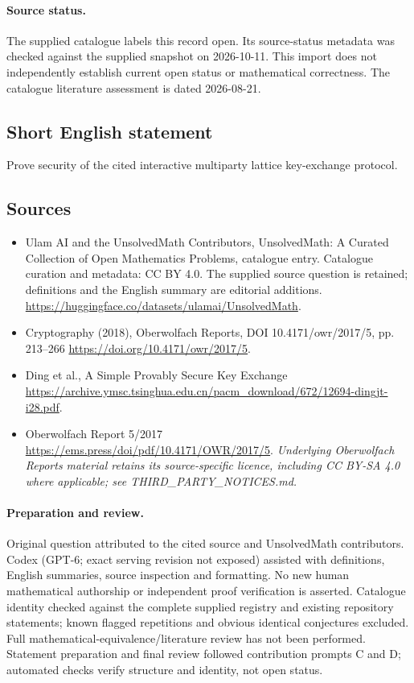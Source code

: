 \documentclass[11pt]{article}
\begin{document}
\paragraph{Source status.}
The supplied catalogue labels this record open. Its source-status metadata was checked against the supplied snapshot on 2026-10-11. This import does not independently establish current open status or mathematical correctness. The catalogue literature assessment is dated 2026-08-21.
\subsection{Short English statement}
Prove security of the cited interactive multiparty lattice key-exchange protocol.
\subsection{Sources}
\begin{itemize}
\item[\hypertarget{source:statement:1}{S1}] Ulam AI and the UnsolvedMath Contributors, UnsolvedMath: A Curated Collection of Open Mathematics Problems, catalogue entry. Catalogue curation and metadata: CC BY 4.0. The supplied source question is retained; definitions and the English summary are editorial additions.
\url{https://huggingface.co/datasets/ulamai/UnsolvedMath}.
\item[\hypertarget{source:statement:2}{S2}] Cryptography (2018), Oberwolfach Reports, DOI 10.4171/owr/2017/5, pp. 213--266
\url{https://doi.org/10.4171/owr/2017/5}.
\item[\hypertarget{source:statement:3}{S3}] Ding et al., A Simple Provably Secure Key Exchange
\url{https://archive.ymsc.tsinghua.edu.cn/pacm_download/672/12694-dingjt-i28.pdf}.
\item[\hypertarget{source:statement:4}{S4}] Oberwolfach Report 5/2017
\url{https://ems.press/doi/pdf/10.4171/OWR/2017/5}.
\textit{Underlying Oberwolfach Reports material retains its source-specific licence, including CC BY-SA 4.0 where applicable; see THIRD\_PARTY\_NOTICES.md.}
\end{itemize}
\paragraph{Preparation and review.}
Original question attributed to the cited source and UnsolvedMath contributors. Codex (GPT-6; exact serving revision not exposed) assisted with definitions, English summaries, source inspection and formatting. No new human mathematical authorship or independent proof verification is asserted. Catalogue identity checked against the complete supplied registry and existing repository statements; known flagged repetitions and obvious identical conjectures excluded. Full mathematical-equivalence/literature review has not been performed. Statement preparation and final review followed contribution prompts C and D; automated checks verify structure and identity, not open status.
\label{end:statement}
\end{document}
